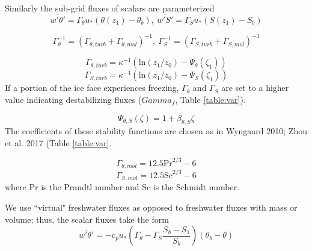 \documentclass[draft]{styles/agujournal2019}
\begin{document}
Similarly the sub-grid fluxes of scalars are parameterized
\begin{equation}
    \overline{w'\theta'} = \Gamma_{\theta} u_* (\theta(z_1) - \theta_b),\: 
    \overline{w'S'} = \Gamma_S u_* (S(z_1) - S_b)
\end{equation}

\begin{equation}
    \Gamma_{\theta}^{-1} = (\Gamma_{\theta,turb} + \Gamma_{\theta,mol})^{-1},\:
    \Gamma_S^{-1} = (\Gamma_{S,turb} + \Gamma_{S,mol})^{-1}
\end{equation}

\begin{equation}
    \Gamma_{\theta,turb} = \kappa^{-1} (\textrm{ln}(z_1/z_0) - \Psi_{\theta}(\zeta_1))
\end{equation}
\begin{equation}
    \Gamma_{S,turb} = \kappa^{-1} (\textrm{ln}(z_1/z_0) - \Psi_S(\zeta_1))
\end{equation}
If a portion of the ice face experiences freezing, $\Gamma_\theta$ and $\Gamma_S$ are set to a higher value indicating destabilizing fluxes ($Gamma_{f}$, Table \ref{table:var}).

\begin{equation}
    \Psi_{\theta,S}(\zeta) = 1 + \beta_{\theta,S} \zeta
\end{equation}
The coefficients of these stability functions are chosen as in Wyngaard 2010; Zhou et al. 2017 (Table \ref{table:var}.


\begin{equation}
    \Gamma_{\theta,mol} = 12.5 \textrm{Pr}^{2/3} - 6
\end{equation}
\begin{equation}
    \Gamma_{S,mol} = 12.5 \textrm{Sc}^{2/3} - 6
\end{equation}
where Pr is the Prandtl number and Sc is the Schmidt number. %

We use ``virtual" freshwater fluxes as opposed to freshwater fluxes with mass or volume; thus, the scalar fluxes take the form \cite{XX}
\begin{equation}
    \overline{w'\theta'} = -c_p u_*
    (\Gamma_{\theta} - \Gamma_S \frac{S_b - S_1}{S_b})(\theta_b-\theta)
\end{equation}
\end{document}
